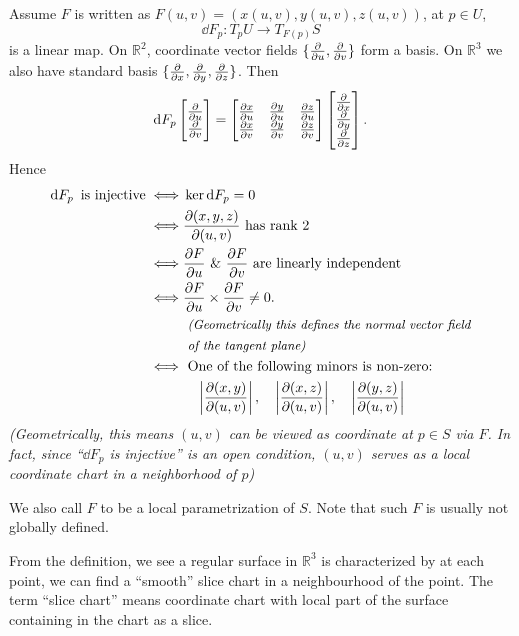 Assume \(F\) is written as \(F(u,v)=(x(u,v),y(u,v),z(u,v))\), at \(p\in U\), \[
    \dd{F_p}\colon T_p U\to T_{F(p)}S
\] is a linear map. On \(\mathbb{R}^2\), coordinate vector fields \(\{\pdv{u},
\pdv{v}\}\) form a basis. On \(\mathbb{R}^3\) we also have standard basis
\(\{\pdv{x},\pdv{y},\pdv{z}\}\). Then \[
    \dd{F_p}\begin{bmatrix}
        \pdv{u}\\ \pdv{v}
    \end{bmatrix}
    =\begin{bmatrix}
        \pdv{x}{u} & \pdv{y}{u} & \pdv{z}{u} \\ 
        \pdv{x}{v} & \pdv{y}{v} & \pdv{z}{v}
    \end{bmatrix}
    \begin{bmatrix}
        \pdv{x}\\ \pdv{y}\\ \pdv{z}
    \end{bmatrix}
.\] Hence
\begin{align*}
    \dd{F_p}\text{ is injective}
    \iff & \ker\dd{F_p}=0 \\
    \iff & \pdv{(x,y,z)}{(u,v)}\text{ has rank 2} \\
    \iff & \pdv{F}{u}\text{ \& }\pdv{F}{v}\text{ are linearly independent} \\
    \iff & \pdv{F}{u}\times \pdv{F}{v}\neq 0. \\
    & \text{\small\itshape\/ (Geometrically this defines the normal vector field} \\
    & \text{\small\itshape\/ of the tangent plane)} \\
    \iff & \text{ One of the following minors is non-zero:}\\
    & \quad\left|\pdv{(x,y)}{(u,v)}\right|,\quad\left|\pdv{(x,z)}{(u,v)}\right|,
    \quad\left|\pdv{(y,z)}{(u,v)}\right|
\end{align*}
{\small\itshape
    (Geometrically, this means \((u,v)\) can be viewed as coordinate at \(p\in S\)
    via \(F\). In fact, since ``\(\dd{F_p}\) is injective'' is an open condition,
    \((u,v)\) serves as a local coordinate chart in a neighborhood of \(p\))
}

We also call \(F\) to be a local parametrization of \(S\). Note that such \(F\)
is usually not globally defined.

From the definition, we see a regular surface in \(\mathbb{R}^3\) is characterized
by at each point, we can find a ``smooth'' slice chart in a neighbourhood of the
point. The term ``slice chart'' means coordinate chart with local part of the
surface containing in the chart as a slice.

